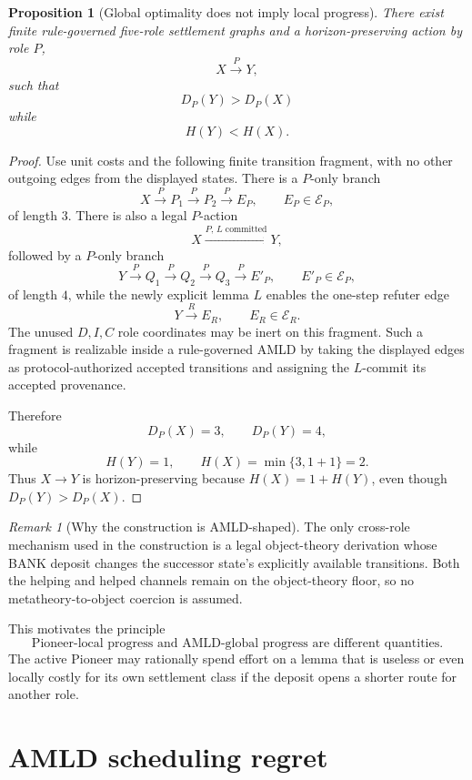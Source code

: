 \documentclass[11pt]{article}
\newtheorem{proposition}[definition]{Proposition}
\theoremstyle{remark}
\newtheorem{remark}[definition]{Remark}
\newcommand{\Exit}{\mathcal E}
\begin{document}
\begin{proposition}[Global optimality does not imply local progress]
There exist finite rule-governed five-role settlement graphs and a horizon-preserving action by role $P$,
\[
X\xrightarrow{P}Y,
\]
such that
\[
D_P(Y)>D_P(X)
\]
while
\[
H(Y)<H(X).
\]
\end{proposition}
\begin{proof}
Use unit costs and the following finite transition fragment, with no other outgoing edges from the displayed states. There is a $P$-only branch
\[
X\xrightarrow{P}P_1\xrightarrow{P}P_2\xrightarrow{P}E_P,
\qquad E_P\in\Exit_P,
\]
of length $3$. There is also a legal $P$-action
\[
X\xrightarrow{P,\,L\text{ committed}}Y,
\]
followed by a $P$-only branch
\[
Y\xrightarrow{P}Q_1\xrightarrow{P}Q_2\xrightarrow{P}Q_3\xrightarrow{P}E'_P,
\qquad E'_P\in\Exit_P,
\]
of length $4$, while the newly explicit lemma $L$ enables the one-step refuter edge
\[
Y\xrightarrow{R}E_R,
\qquad E_R\in\Exit_R.
\]
The unused $D,I,C$ role coordinates may be inert on this fragment. Such a fragment is realizable inside a rule-governed AMLD by taking the displayed edges as protocol-authorized accepted transitions and assigning the $L$-commit its accepted provenance.

Therefore
\[
D_P(X)=3,\qquad D_P(Y)=4,
\]
while
\[
H(Y)=1,\qquad H(X)=\min\{3,1+1\}=2.
\]
Thus $X\to Y$ is horizon-preserving because $H(X)=1+H(Y)$, even though $D_P(Y)>D_P(X)$.
\end{proof}

\begin{remark}[Why the construction is AMLD-shaped]
The only cross-role mechanism used in the construction is a legal object-theory derivation whose BANK deposit changes the successor state's explicitly available transitions. Both the helping and helped channels remain on the object-theory floor, so no metatheory-to-object coercion is assumed.
\end{remark}

This motivates the principle
\[
\boxed{\text{Pioneer-local progress and AMLD-global progress are different quantities.}}
\]
The active Pioneer may rationally spend effort on a lemma that is useless or even locally costly for its own settlement class if the deposit opens a shorter route for another role.

\section{AMLD scheduling regret}
\end{document}
